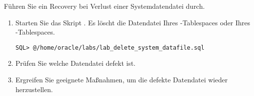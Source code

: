     \item Führen Sie ein Recovery bei Verlust einer Systemdatendatei durch.
      \begin{enumerate}
        \item Starten Sie das Skript . Es löscht die Datendatei Ihres -Tablespaces oder Ihres -Tablespaces.
          \begin{lstlisting}[language=terminal]
SQL> @/home/oracle/labs/lab_delete_system_datafile.sql
          \end{lstlisting}
        \item Prüfen Sie welche Datendatei defekt ist.
        \item Ergreifen Sie geeignete Maßnahmen, um die defekte Datendatei wieder herzustellen.
      \end{enumerate}